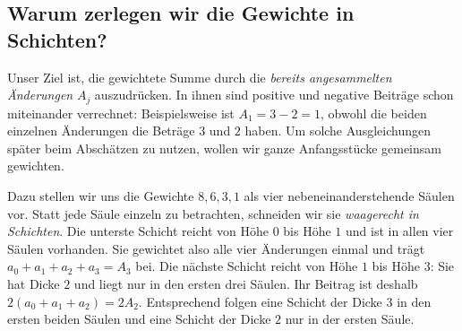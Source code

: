 \subsection*{Warum zerlegen wir die Gewichte in Schichten?}

Unser Ziel ist, die gewichtete Summe durch die \emph{bereits
angesammelten Änderungen} $A_j$ auszudrücken. In ihnen sind positive
und negative Beiträge schon miteinander verrechnet: Beispielsweise
ist $A_1=3-2=1$, obwohl die beiden einzelnen Änderungen die Beträge
$3$ und $2$ haben. Um solche Ausgleichungen später beim Abschätzen
zu nutzen, wollen wir ganze Anfangsstücke gemeinsam gewichten.

Dazu stellen wir uns die Gewichte $8,6,3,1$ als vier nebeneinanderstehende
Säulen vor. Statt jede Säule einzeln zu betrachten, schneiden wir sie
\emph{waagerecht in Schichten}. Die unterste Schicht reicht von Höhe
$0$ bis Höhe $1$ und ist in allen vier Säulen vorhanden. Sie gewichtet
also alle vier Änderungen einmal und trägt
$a_0+a_1+a_2+a_3=A_3$ bei. Die nächste Schicht reicht von Höhe $1$
bis Höhe $3$: Sie hat Dicke $2$ und liegt nur in den ersten drei
Säulen. Ihr Beitrag ist deshalb $2(a_0+a_1+a_2)=2A_2$.
Entsprechend folgen eine Schicht der Dicke $3$ in den ersten beiden
Säulen und eine Schicht der Dicke $2$ nur in der ersten Säule.



